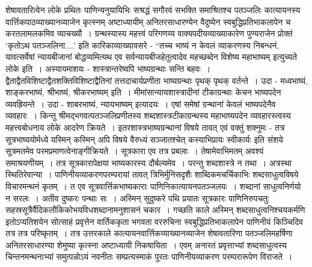 {शेषावतारित्वेन लोके प्रथितः पाणिन्यनुयायिभिः सश्रद्धं सगौरवं सभक्ति समाश्रितश्च \-पतञ्जलिः कात्यायनस्य वार्त्तिकपाठव्याख्यानव्याजेन कृत्स्नम् अष्टाध्यायीम् अनितरसाधारण्येन \break वैदुष्येन स्वबुद्धिप्रतिभाकलापेन च करतलामलकमिव व्याचख्यौ~। ग्रन्थस्यास्य महत्त्वं परि\-गणय्य वाक्यपदीयव्याख्याकारेण पुण्यराजेन प्रोक्तं ‘कृतोऽथ पतञ्जलिना....’ इति कारिकाव्याख्यावसरे - “तच्च भाष्यं न केवलं व्याकरणस्य निबन्धनं, यावत्सर्वेषां न्यायबीजानां \-बोद्धव्यमित्यथ एव सर्वन्यायबीजहेतुत्वादेव महच्छब्देन विशेष्य महाभाष्यम् इत्युच्यते लोके इति~। अस्यायमाशयः - शास्त्रान्तरेष्वपि भाष्यग्रन्थाः सन्ति बहवः~। द्वैताद्वैतविशिष्टाद्वैत\-शक्तिविशिष्टाद्वैतिनां तत्तदाचार्यप्रणीता भाष्यग्रन्थाः पृथक् पृथक् वर्तन्ते~। उदा - मध्व\-भाष्यं, शाङ्करभाष्यं, श्रीभाष्यं, श्रीकरभाष्यम् इति~। मीमांसान्यायशास्त्रादीनां टीकाग्रन्थाः केचन \-भाष्यपदेन व्यवह्रियन्ते~। उदा - शाबरभाष्यं, न्यायभाष्यम् इत्यादयः~। एषां समेषां ग्रन्थानां केवलं भाष्यपदेनैव व्यवहारः~। किन्तु श्रीमद्भगवत्पतञ्जलिप्रणीतस्य शब्दशास्त्रटीकाग्रन्थस्य महाभाष्यपदेन व्यवहारस्त्वस्य महत्त्वबोधनाय लोके आदरेण क्रियते~। इतरशास्त्रभाष्य\-ग्रन्थानां विषये तावत् एवं वक्तुं शक्नुमः - तत्र सूत्रभाष्ययोर्मध्ये यस्मिन् कस्मिन् अपि विषये वैरुध्यं सञ्जातश्चेत् कस्याभिप्रायः स्वीकार्यः इति संशये सूत्रमतमेव परमप्रमाणत्वेनाङ्गीक्रियते~। सूत्र\-कारा एव तत्र प्रबलाः~। तेषामेवाभिमतम् अवश्यं समाश्रयणीयम्~। तत्र सूत्रकारापेक्षया \break भाष्यकारस्य दौर्बल्यमेव~। परन्तु शब्दशास्त्रे न तथा~। अत्रस्था स्थितिरेवान्या~। पाणिनीयव्याकरणपरम्परायां तावत् त्रिभिर्मुनिसदृशैः शाब्दिकमचर्चिकाभिः शब्दसाधुत्वविषये विचा\-रमन्थनं कृतम्~। त एव सूत्रवार्त्तिकभाष्यकाराः पाणिनिकात्यायनपतञ्जलयः~। शब्दानां \-साधुत्वनिर्णयो न सरलः~। अतीव दुष्करः पन्थाः सः~। अस्मिन् सुदुष्करे पथि प्रयातः \-सूत्रकारः पाणिनिरुपचतुः सहस्रसूत्रैर्वैदिकलौकिकोभयविधशब्दानामनुशासनं चकार~। गच्छति काले अस्मिन् शब्दसाधुत्वनिश्चयकर्मणि इतोऽप्यतिशयेन सोत्साहं प्रवृत्तेन वार्तिककृता भगवता वररुचिना स्वबुद्धिप्रतिभाकलापेन पाणिनीयं किञ्चिदिव तत्र तत्र परिष्कृतम्~। तत्र उत्तरकाले कात्यायनवार्त्तिकव्याख्यानव्याजेन शेषावतारिणा पतञ्जलिमहर्षिणा अनितरसाधारण्या शेमुष्या कृत्स्ना अष्टाध्यायी निकषायिता~। एवम् अनारतं प्रवृत्ताभ्यां शब्दसाधुत्वस्य चिन्तन\-मन्थनाभ्यां समुत्पन्नोऽयं नवनीतः सम्प्रत्यस्माकं पुरतः पाणिनीयव्याकरण परम्परारूपेण \break विराजते~। 

}
